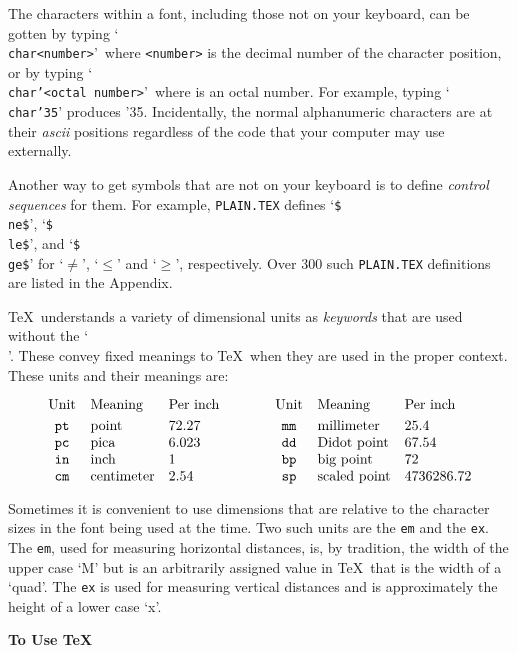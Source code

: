 The characters within a font, including those not on your keyboard, can be
gotten by typing `{\tt \\char<number>}'\ where {\tt <number>} is the
decimal number of the character position, or by typing `{\tt \\char'<octal
number>}'\ where {\tt <octal number>} is an octal number.  For example, typing
`{\tt \\char'35}' produces {\char'35}.  Incidentally, the normal
alphanumeric characters are at their {\sl ascii} positions regardless of
the code that your computer may use externally.

Another way to get symbols that are not on your keyboard is to define
{\sl control sequences} for them. For example, {\tt PLAIN.TEX} defines 
`{\tt \$\\ne\$}',
`{\tt \$\\le\$}', and `{\tt \$\\ge\$}' for `$\ne$', `$\le$' and
`$\ge$', respectively.
Over 300 such {\tt PLAIN.TEX} definitions are listed in the Appendix.



\TeX\ understands a variety of dimensional units as
{\sl keywords} that are used without the `{\tt \\}'. These 
convey fixed meanings to \TeX\ when they are used in the proper context.
These units and their meanings are:

$$\vbox{\halign{\tt \hfil#\hfil\quad&#\quad&#\qquad\qquad\hfil
&\tt \hfil#\hfil\quad&#\hfil\quad&#\cr
{\rm Unit}&Meaning&Per inch&{\rm Unit}&Meaning&Per inch\hfil\cr
\noalign{\smallskip}
pt&point&72.27&mm&millimeter&25.4\cr
pc&pica&6.023&dd&Didot point&67.54\cr
in&inch&1&bp&big point&72\cr
cm&centimeter&2.54&
sp&scaled point&4736286.72\cr}}$$

Sometimes it is convenient to use dimensions that are relative to the
character sizes in the font being used at the time. Two such units are
the {\tt em} and the {\tt ex}.
The {\tt em}, used for measuring horizontal distances, is, by tradition,
the width of the upper case `M'  but is an arbitrarily assigned value in
\TeX\ that is the width of a `quad'.  The {\tt ex} is used for measuring
vertical distances and is approximately the height of a lower case `x'.

{\bf To Use \TeX }

